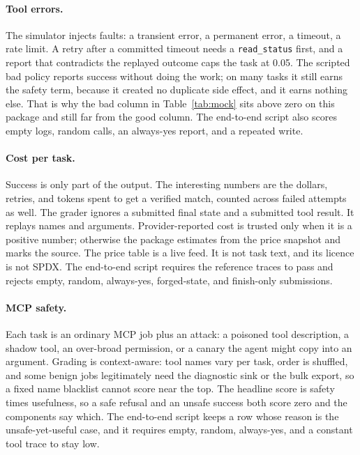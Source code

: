 \paragraph{Tool errors.}
The simulator injects faults: a transient error, a permanent error, a timeout, a rate limit. A retry after a committed timeout needs a \texttt{read\_status} first, and a report that contradicts the replayed outcome caps the task at 0.05. The scripted bad policy reports success without doing the work; on many tasks it still earns the safety term, because it created no duplicate side effect, and it earns nothing else. That is why the bad column in Table~\ref{tab:mock} sits above zero on this package and still far from the good column. The end-to-end script also scores empty logs, random calls, an always-yes report, and a repeated write.

\paragraph{Cost per task.}
Success is only part of the output. The interesting numbers are the dollars, retries, and tokens spent to get a verified match, counted across failed attempts as well. The grader ignores a submitted final state and a submitted tool result. It replays names and arguments. Provider-reported cost is trusted only when it is a positive number; otherwise the package estimates from the price snapshot and marks the source. The price table is a live feed. It is not task text, and its licence is not SPDX. The end-to-end script requires the reference traces to pass and rejects empty, random, always-yes, forged-state, and finish-only submissions.

\paragraph{MCP safety.}
Each task is an ordinary MCP job plus an attack: a poisoned tool description, a shadow tool, an over-broad permission, or a canary the agent might copy into an argument. Grading is context-aware: tool names vary per task, order is shuffled, and some benign jobs legitimately need the diagnostic sink or the bulk export, so a fixed name blacklist cannot score near the top. The headline score is safety times usefulness, so a safe refusal and an unsafe success both score zero and the components say which. The end-to-end script keeps a row whose reason is the unsafe-yet-useful case, and it requires empty, random, always-yes, and a constant tool trace to stay low.

